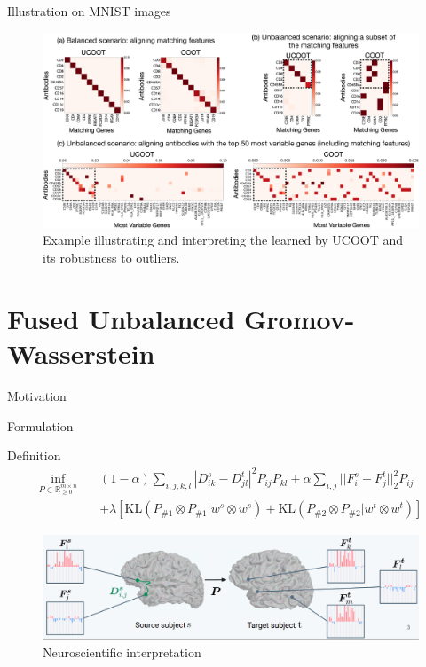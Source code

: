 \documentclass{beamer}
\newcommand{\kl}{\text{KL}}
\newcommand{\bbR}{\mathbb R}
\begin{document}
\begin{frame}{Illustration on MNIST images}
\tiny
\begin{figure}
      \centering
      \includegraphics[width=1.\linewidth, keepaspectratio=true]{OT_new/genes-alignments.pdf}
      \caption*{Example illustrating and interpreting the {\color{red}{feature alignment $\pi^f$}} learned by UCOOT and its robustness to outliers.}
  \end{figure}
  \end{frame}

\section{Fused Unbalanced Gromov-Wasserstein}

\begin{frame}{Motivation}
\tiny

\end{frame}

\begin{frame}{Formulation}
\tiny
\begin{block}{Definition}
\begin{align*}
  \inf_{P \in \bbR^{m \times n}_{\geq 0}} \quad
  &(1 - \alpha) \sum_{i,j,k,l} | D^s_{ik} - D^t_{jl}|^2 P_{ij} P_{kl}
  + \alpha \sum_{i,j} || F^s_i - F^t_j||_2^2 P_{ij} \\
  &+ \lambda \left[ \kl(P_{\# 1} \otimes P_{\# 1} \vert w^s \otimes w^s)
  + \kl(P_{\# 2} \otimes P_{\# 2} \vert w^t \otimes w^t) \right]
\end{align*}
\end{block}
\begin{figure}
  \centering
  \includegraphics[width=1.\linewidth, keepaspectratio=true]{OT_new/fugw.png}
  \caption*{Neuroscientific interpretation}
\end{figure}
\end{frame}
\end{document}
